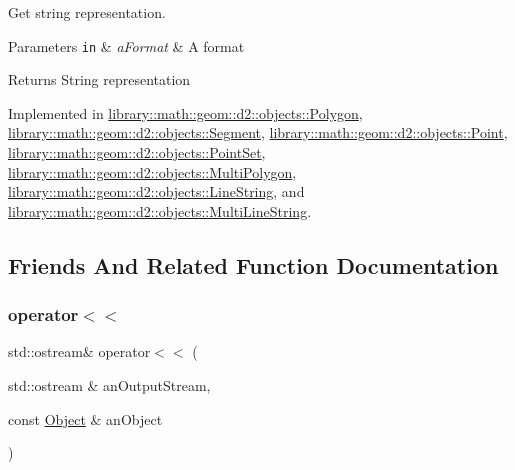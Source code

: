 Get string representation. 


\begin{DoxyParams}[1]{Parameters}
\mbox{\tt in}  & {\em a\+Format} & A format \\
\hline
\end{DoxyParams}
\begin{DoxyReturn}{Returns}
String representation 
\end{DoxyReturn}


Implemented in \hyperlink{classlibrary_1_1math_1_1geom_1_1d2_1_1objects_1_1_polygon_acef17857f29323e985fba23441ed1171}{library\+::math\+::geom\+::d2\+::objects\+::\+Polygon}, \hyperlink{classlibrary_1_1math_1_1geom_1_1d2_1_1objects_1_1_segment_a6efb82e3e5e5d97214b827bc6f8574e3}{library\+::math\+::geom\+::d2\+::objects\+::\+Segment}, \hyperlink{classlibrary_1_1math_1_1geom_1_1d2_1_1objects_1_1_point_ae645a37f426dac123d566fb5511d595d}{library\+::math\+::geom\+::d2\+::objects\+::\+Point}, \hyperlink{classlibrary_1_1math_1_1geom_1_1d2_1_1objects_1_1_point_set_a4eeece63192481627cb0f991a4eef1a4}{library\+::math\+::geom\+::d2\+::objects\+::\+Point\+Set}, \hyperlink{classlibrary_1_1math_1_1geom_1_1d2_1_1objects_1_1_multi_polygon_a598e024d69ca9a99d97cf7412b334869}{library\+::math\+::geom\+::d2\+::objects\+::\+Multi\+Polygon}, \hyperlink{classlibrary_1_1math_1_1geom_1_1d2_1_1objects_1_1_line_string_a13c0a7c5b8da7724b5a2dd2933064768}{library\+::math\+::geom\+::d2\+::objects\+::\+Line\+String}, and \hyperlink{classlibrary_1_1math_1_1geom_1_1d2_1_1objects_1_1_multi_line_string_a71d1e434196bb8d67054ad28d8aa59a6}{library\+::math\+::geom\+::d2\+::objects\+::\+Multi\+Line\+String}.



\subsection{Friends And Related Function Documentation}
\mbox{\label{classlibrary_1_1math_1_1geom_1_1d2_1_1_object_a418df9bf4a73078f3d494edef1743f8d}} 
\subsubsection{\texorpdfstring{operator$<$$<$}{operator<<}}
{\footnotesize\ttfamily std\+::ostream\& operator$<$$<$ (\begin{DoxyParamCaption}\item[{std\+::ostream \&}]{an\+Output\+Stream,  }\item[{const \hyperlink{classlibrary_1_1math_1_1geom_1_1d2_1_1_object}{Object} \&}]{an\+Object }\end{DoxyParamCaption})\hspace{0.3cm}{\ttfamily [friend]}}



